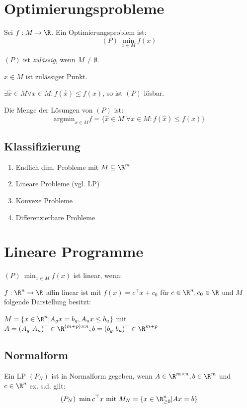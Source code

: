 \section*{Optimierungsprobleme}

Sei \(f: M \to \R\). Ein Optimierungsproblem ist:
\[(P) \ \min_{x \in M} f(x)\]

\((P)\) ist \emph{zulässig}, wenn \(M \neq \emptyset\).

\(x \in M\) ist zulässiger Punkt.

\(\exists \hat x \in M \forall x \in M : f(\hat x) \leq f(x)\), so ist \((P)\) lösbar.

Die Menge der Lösungen von \((P)\) ist:
\[\text{argmin}_{x \in M} f = \{ \hat x \in M | \forall x \in M : f(\hat x) \leq f(x) \}\]

\subsection*{Klassifizierung}

\begin{enumerate}[label=(\alph*)]
	\item Endlich dim. Probleme mit \(M \subseteq \R^m\)
	\item Lineare Probleme (vgl. LP)
	\item Konvexe Probleme
	\item Differenzierbare Probleme
\end{enumerate}

\section*{Lineare Programme}

\((P) \ \min_{x \in M} f(x)\) ist linear, wenn:

\(f: \R^n \to \R\) affin linear ist mit \(f(x)=c^\top x + c_0\) für \(c \in \R^n, c_0 \in \R\) und \(M\) folgende Darstellung besitzt:

\(M = \{ x \in \R^n | A_g x = b_g, A_u x \leq b_u \}\) mit \\ \(A = (A_g \ A_n)^\top \in \R^{(m+p) \times n}, b = (b_g \ b_u)^\top \in \R^{m+p}\)

\subsection*{Normalform}

Ein LP \((P_N)\) ist in Normalform gegeben, wenn \(A \in \R^{m \times n}, b \in \R^m\) und \(c \in \R^n\) ex. s.d. gilt:
\[(P_N) \ \min c^\top x \text{ mit } M_N = \{ x \in \R_{\geq 0}^n | Ax=b \}\]

